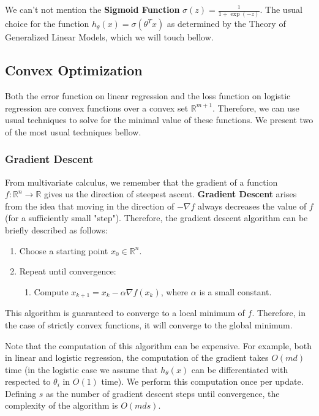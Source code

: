 \documentclass{article}
\newcommand{\R}{\mathbb{R}}
\begin{document}
We can't not mention the \textbf{Sigmoid Function} $\sigma(z) = \frac{1}{1 + \exp(-z)}$.
The usual choice for the function $h_\theta(x) = \sigma(\theta^T x)$ as determined by the Theory of Generalized Linear Models, which we will touch bellow.

\subsection{Convex Optimization}

Both the error function on linear regression and the loss function on logistic regression are convex functions over a convex set $\R^{m+1}$.
Therefore, we can use usual techniques to solve for the minimal value of these functions.
We present two of the most usual techniques bellow.

\subsubsection{Gradient Descent}

From multivariate calculus, we remember that the gradient of a function $f: \R^n \to \R$ gives us the direction of steepest ascent.
\textbf{Gradient Descent} arises from the idea that moving in the direction of $-\nabla f$ always decreases the value of $f$ (for a sufficiently small "step").
Therefore, the gradient descent algorithm can be briefly described as follows:
\begin{enumerate}
\item Choose a starting point $x_0 \in \R^n$.
\item Repeat until convergence:
\begin{enumerate}
\item Compute $x_{k+1} = x_k - \alpha \nabla f(x_k)$, where $\alpha$ is a small constant.
\end{enumerate}
\end{enumerate}
This algorithm is guaranteed to converge to a local minimum of $f$.
Therefore, in the case of strictly convex functions, it will converge to the global minimum.

Note that the computation of this algorithm can be expensive. 
For example, both in linear and logistic regression, the computation of the gradient takes $O(md)$ time (in the logistic case we assume that $h_\theta(x)$ can be differentiated with respected to $\theta_i$ in $O(1)$ time).
We perform this computation once per update.
Defining $s$ as the number of gradient descent steps until convergence, the complexity of the algorithm is $O(mds)$.
\end{document}

